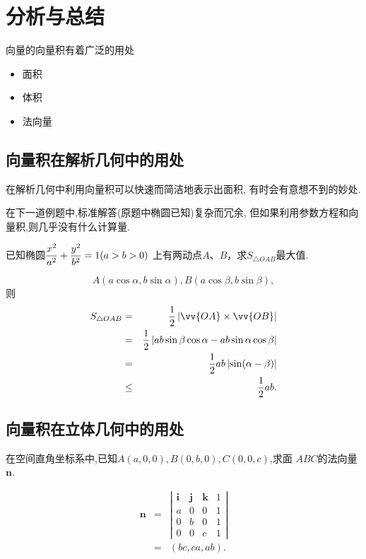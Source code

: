 \section{分析与总结}
向量的向量积有着广泛的用处
\begin{itemize}
  \item 面积
  \item 体积
  \item 法向量
\end{itemize}

\subsection{向量积在解析几何中的用处}
在解析几何中利用向量积可以快速而简洁地表示出面积,
有时会有意想不到的妙处.

在下一道例题中,标准解答(原题中椭圆已知)复杂而冗余,
但如果利用参数方程和向量积,则几乎没有什么计算量.

\prob 已知椭圆$\displaystyle\frac{x^2}{a^2}+\frac{y^2}{b^2}=1(a>b>0)$
上有两动点$A$、$B$，求$S_{\triangle OAB}$最大值.

$$
    A(a\cos\alpha,b\sin\alpha),
    B(a\cos\beta,b\sin\beta),$$
则
\begin{eqnarray}
S_{\triangle OAB} 
&=&\frac{1}{2}\abs{\vv{OA}\times\vv{OB}}\nonumber\\
&=&\frac{1}{2}\abs{ab\sin\beta\cos\alpha-ab\sin\alpha\cos\beta}\nonumber\\
&=&\frac{1}{2}ab\abs{\sin(\alpha-\beta)}\nonumber\\
&\leq&\frac{1}{2}ab\nonumber.
\end{eqnarray}
\solend

\subsection{向量积在立体几何中的用处}

\prob 在空间直角坐标系中,已知$A(a,0,0),B(0,b,0),C(0,0,c)$,求面
$ABC$的法向量$\bm{n}$.

\sol 
\begin{eqnarray}
  \bm{n}&=&
  \left|
  \begin{array}{cccc}
    \bm{i}&\bm{j}&\bm{k}&1\\
    a&0&0&1\\
    0&b&0&1\\
    0&0&c&1
  \end{array}
  \right|\nonumber\\
  &=&(bc,ca,ab).\nonumber
\end{eqnarray}
\solend

